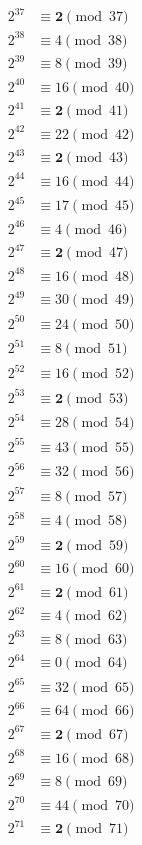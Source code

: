 \documentclass[12pt]{handout}
\begin{document}
\begin{multicols}{3}
\begin{align*}
\end{align*}
\begin{align*}
2^{37} &\equiv \mathbf{2} \pmod{37} \\
2^{38} &\equiv 4 \pmod{38} \\
2^{39} &\equiv 8 \pmod{39} \\
2^{40} &\equiv 16 \pmod{40} \\
2^{41} &\equiv \mathbf{2} \pmod{41} \\
2^{42} &\equiv 22 \pmod{42} \\
2^{43} &\equiv \mathbf{2} \pmod{43} \\
2^{44} &\equiv 16 \pmod{44} \\
2^{45} &\equiv 17 \pmod{45} \\
2^{46} &\equiv 4 \pmod{46} \\
2^{47} &\equiv \mathbf{2} \pmod{47} \\
2^{48} &\equiv 16 \pmod{48} \\
2^{49} &\equiv 30 \pmod{49} \\
2^{50} &\equiv 24 \pmod{50} \\
2^{51} &\equiv 8 \pmod{51} \\
2^{52} &\equiv 16 \pmod{52} \\
2^{53} &\equiv \mathbf{2} \pmod{53} \\
2^{54} &\equiv 28 \pmod{54} \\
2^{55} &\equiv 43 \pmod{55} \\
2^{56} &\equiv 32 \pmod{56} \\
2^{57} &\equiv 8 \pmod{57} \\
2^{58} &\equiv 4 \pmod{58} \\
2^{59} &\equiv \mathbf{2} \pmod{59} \\
2^{60} &\equiv 16 \pmod{60} \\
2^{61} &\equiv \mathbf{2} \pmod{61} \\
2^{62} &\equiv 4 \pmod{62} \\
2^{63} &\equiv 8 \pmod{63} \\
2^{64} &\equiv 0 \pmod{64} \\
2^{65} &\equiv 32 \pmod{65} \\
2^{66} &\equiv 64 \pmod{66} \\
2^{67} &\equiv \mathbf{2} \pmod{67} \\
2^{68} &\equiv 16 \pmod{68} \\
2^{69} &\equiv 8 \pmod{69} \\
2^{70} &\equiv 44 \pmod{70} \\
2^{71} &\equiv \mathbf{2} \pmod{71}

\end{align*}
\end{multicols}
\end{document}
